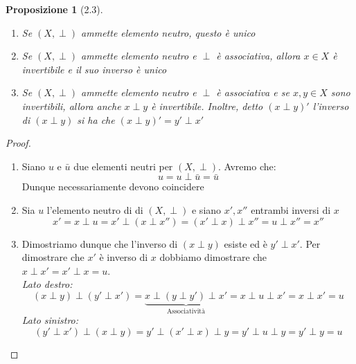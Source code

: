 \documentclass[11pt,a4paper]{article}
\theoremstyle{manuale}
\newtheorem*{proposizione}{Proposizione}
\theoremstyle{manualecorsivo}
\begin{document}
	\begin{proposizione}[2.3]
		 \leavevmode\vspace{-0.5\baselineskip}
		\begin{enumerate}[label=\roman*)]
			
			\item Se $(X, \perp)$ ammette elemento neutro, questo è unico
			
			\item Se $(X, \perp)$ ammette elemento neutro e $\perp$ è associativa, allora $x \in X$ è invertibile e il suo inverso è unico
			
			\item Se $(X, \perp)$ ammette elemento neutro e $\perp$ è associativa e se $x,y \in X$ sono invertibili, allora anche $x \perp y$ è invertibile. Inoltre, detto $(x \perp y)'$ l'inverso di $(x \perp y)$ si ha che $(x \perp y)' = y' \perp x'$
		\end{enumerate}
	\end{proposizione}
	
	\begin{proof}
		\leavevmode\vspace{-0.5\baselineskip}
		\begin{enumerate}[label=\roman*)]
			
			\item Siano $u$ e $\bar{u}$ due elementi neutri per $(X, \perp)$. Avremo che:
			$$ u = u \perp \bar{u} = \bar{u} $$
			Dunque necessariamente devono coincidere
			
			\item Sia $u$ l'elemento neutro di di $(X, \perp)$ e siano $x', x''$ entrambi inversi di $x$
			$$x' = x \perp u = x' \perp (x \perp x'') = (x' \perp x) \perp x'' = u \perp x'' = x''$$
			
			\item Dimostriamo dunque che l'inverso di $(x \perp y)$ esiste ed è $y' \perp x'$. Per dimostrare che $x'$ è inverso di $x$ dobbiamo dimostrare che $x \perp x' = x' \perp x = u$.
			\\
			\textit{Lato destro:}
			$$ (x \perp y) \perp (y' \perp x') = \underbrace{x \perp (y \perp y') \perp x'}_{\text{Associatività}} = x \perp u \perp x' = x \perp x' = u $$
			\textit{Lato sinistro:}
			$$(y' \perp x') \perp (x \perp y) = y' \perp (x' \perp x) \perp y = y' \perp u \perp y = y' \perp y = u$$
		\end{enumerate}
	\end{proof}
	
\end{document}
